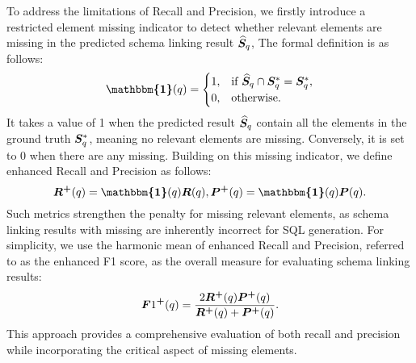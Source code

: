 To address the limitations of Recall and Precision, we firstly introduce a restricted element missing indicator to detect whether relevant elements are missing in the predicted schema linking result $\widehat{{\bm{S}}}_q$, The formal definition is as follows:
\begin{equation} \label{equ: indicator function}
\bm{\mathbbm{1}}(q) = 
\begin{cases} 
1, & \text{if } \widehat{\mS}_q \cap \mS^*_q = \mS^*_q, \\
0, & \text{otherwise}.
\end{cases}\end{equation}
It takes a value of 1 when the predicted result $\widehat{{\bm{S}}}_q$ contain all the elements in the ground truth ${\bm{S}}^*_q$, meaning no relevant elements are missing. Conversely, it is set to 0 when there are any missing. Building on this missing indicator, we define enhanced Recall and Precision as follows:
\begin{equation} \label{equ: recall plus}
\mR^{\text{\textbf{+}}}(q) = \bm{\mathbbm{1}}(q)   \mR(q), \mP^{\text{\textbf{+}}}(q) = \bm{\mathbbm{1}}(q)  \mP(q).
\end{equation}
Such metrics strengthen the penalty for missing relevant elements, as schema linking results with missing are inherently incorrect for SQL generation. For simplicity, we use the harmonic mean of enhanced Recall and Precision, referred to as the enhanced F1 score, as the overall measure for evaluating schema linking results:
\begin{equation} \label{equ: traditional F1 for one question}
{{\bm{F}}1}^{\text{\textbf{+}}}(q) =\frac{2 {\bm{R}}^{\text{\textbf{+}}}(q) {\bm{P}}^{\text{\textbf{+}}}(q)}{{\bm{R}}^{\text{\textbf{+}}}(q) + {\bm{P}}^{\text{\textbf{+}}}(q)}.
\end{equation}
This approach provides a comprehensive evaluation of both recall and precision while incorporating the critical aspect of missing elements.